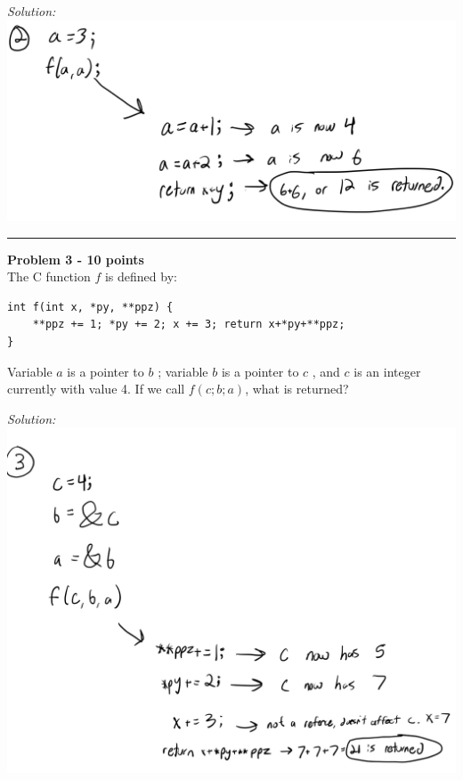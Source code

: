 \documentclass[a4paper, 11pt]{article}
\newenvironment{problem}[2][Problem]
    { \begin{mdframed}[backgroundcolor=gray!20] \textbf{#1 #2} \\}
    {  \end{mdframed}}
\newenvironment{solution}
    {\textit{Solution:}}
    {}
\begin{document}
\begin{solution}
    \includegraphics[scale=.2]{Prob2.jpeg}
\end{solution} 

\noindent\rule{7in}{2.8pt}


\begin{problem}{3 - 10 points}
The C function $f$ is defined by:  
\begin{verbatim}
int f(int x, *py, **ppz) {  
    **ppz += 1; *py += 2; x += 3; return x+*py+**ppz; 
} 
\end{verbatim}

\noindent Variable $a$ is a pointer to $b$ ; variable $b$ is a pointer to $c$ , and $c$ is an integer  currently with value 4. If we call $f ( c; b; a)$, what is returned? 

\end{problem}

\begin{solution}
    \includegraphics[scale=.3]{Prob3.jpeg}
\end{solution} 
\end{document}
